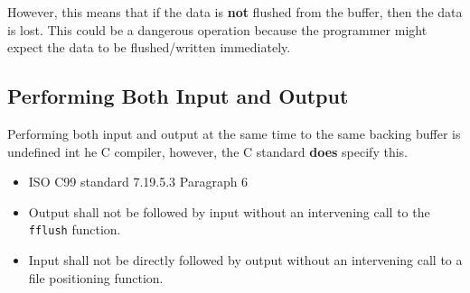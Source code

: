 However, this means that if the data is \textbf{not} flushed from the buffer, then the data is lost.
This could be a dangerous operation because the programmer might expect the data to be flushed/written immediately.

\subsection{Performing Both Input and Output}\label{subsec:Performing_Input_and_Output}
Performing both input and output at the same time to the same backing buffer is undefined int he C compiler, however, the C standard \textbf{does} specify this.
\begin{itemize}[noitemsep]
\item ISO C99 standard 7.19.5.3 Paragraph 6
\item Output shall not be followed by input without an intervening call to the \texttt{fflush} function.
\item Input shall not be directly followed by output without an intervening call to a file positioning function.
\end{itemize}

